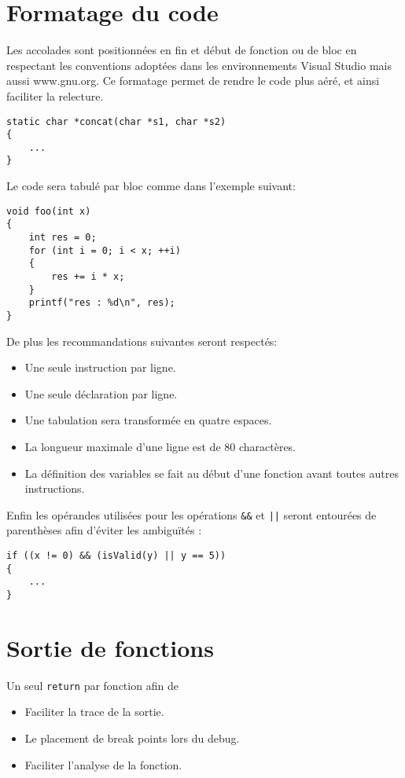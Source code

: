 \section{Formatage du code}
Les accolades sont positionnées en fin et début de fonction ou de bloc en 
respectant les conventions adoptées dans les environnements Visual Studio 
mais aussi www.gnu.org. Ce formatage permet de rendre le code plus aéré, 
et ainsi faciliter la relecture.

\begin{verbatim}
static char *concat(char *s1, char *s2)
{
    ...
}
\end{verbatim}

Le code sera tabulé par bloc comme dans l'exemple suivant:
\begin{verbatim}
void foo(int x)
{
    int res = 0;
    for (int i = 0; i < x; ++i)
    {
        res += i * x;
    }
    printf("res : %d\n", res);
}
\end{verbatim}

De plus les recommandations suivantes seront respectés:
\begin{itemize}
	\item Une seule instruction par ligne.
	\item Une seule déclaration par ligne.
	\item Une tabulation sera transformée en quatre espaces.	
	\item La longueur maximale d'une ligne est de 80 charactères.
    \item La définition des variables se fait au début d'une fonction avant
              toutes autres instructions. 
\end{itemize}

Enfin les opérandes utilisées pour les opérations \texttt{&&} et \texttt{||}
seront entourées de parenthèses afin d'éviter les ambiguïtés :
\begin{verbatim}
if ((x != 0) && (isValid(y) || y == 5))
{
    ...
}
\end{verbatim}

\section{Sortie de fonctions}

Un seul \texttt{return} par fonction afin de
\begin{itemize}
	\item Faciliter la trace de la sortie.
	\item Le placement de break points lors du debug.
	\item Faciliter l’analyse de la fonction.
\end{itemize}

